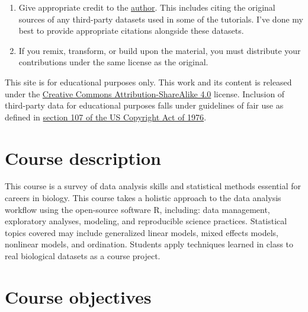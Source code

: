 \documentclass[
  13,
  letterpaper,
]{report}
\providecommand{\tightlist}{%
  \setlength{\itemsep}{0pt}\setlength{\parskip}{0pt}}
\begin{document}
\begin{enumerate}
\def\labelenumi{\arabic{enumi}.}
\tightlist
\item
  Give appropriate credit to the
  \href{https://facultyweb.kennesaw.edu/ngreen62/index.php}{author}.
  This includes citing the original sources of any third-party datasets
  used in some of the tutorials. I've done my best to provide
  appropriate citations alongside these datasets.
\item
  If you remix, transform, or build upon the material, you must
  distribute your contributions under the same license as the original.
\end{enumerate}

This site is for educational purposes only. This work and its content is
released under the
\href{https://creativecommons.org/licenses/by-sa/4.0/}{Creative Commons
Attribution-ShareAlike 4.0} license. Inclusion of third-party data for
educational purposes falls under guidelines of fair use as defined in
\href{https://www.law.cornell.edu/uscode/text/17/107}{section 107 of the
US Copyright Act of 1976}.

\section*{Course description}\label{course-description}


This course is a survey of data analysis skills and statistical methods
essential for careers in biology. This course takes a holistic approach
to the data analysis workflow using the open-source software R,
including: data management, exploratory analyses, modeling, and
reproducible science practices. Statistical topics covered may include
generalized linear models, mixed effects models, nonlinear models, and
ordination. Students apply techniques learned in class to real
biological datasets as a course project.

\section*{Course objectives}\label{course-objectives}

\end{document}
